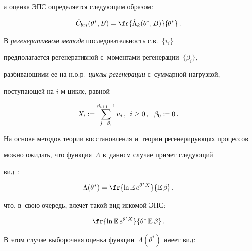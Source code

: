 а оценка ЭПС  определяется следующим образом:


\begin{equation}


\hat{C}_{bm}(\theta^{*}, B)=\fr{\hat{\Lambda}_k(\theta^{*}, B)}{\theta^{*}}\,.


\label{bm_C}


\end{equation}








 В {\it  регенеративном методе}   последовательность с.в.~$\{v_i\}$  


предполагается  регенеративной с~моментами регенерации~$\{\beta_i\}$,  


разбивающими ее  на н.о.р.\ {\it циклы регенерации} с~суммарной нагрузкой, 


поступающей на $i$-м цикле,  равной


\begin{equation*}


X_i:=\sum\limits_{j=\beta_i}^{\beta_{i+1}-1}v_j\,,\enskip i\ge 0\,,\ \ \beta_0:=0\,.




\end{equation*}


На основе методов  теории восстановления и~теории регенерирующих процессов  


можно ожидать, что  функция~$\Lambda$ в~данном случае примет следующий 


вид~\cite{Varna, ICUMT, EB14}:


\begin{equation}


\Lambda(\theta^*)= \fr{\ln \mathbb{E}\, e^{\theta^*  X}}{\mathbb{E}\,\beta}\,,


 \label{reg_L}


\end{equation}


что, в~свою очередь,  влечет такой вид искомой ЭПС:


\begin{equation}


\fr{\ln \mathbb{E}\, e^{\theta^*  X}}{\theta^*\, \mathbb{E}\,\beta}\,.


 \label{reg_L1}


\end{equation}


В этом случае   выборочная оценка функции~$\Lambda(\theta^*)$ имеет вид:


